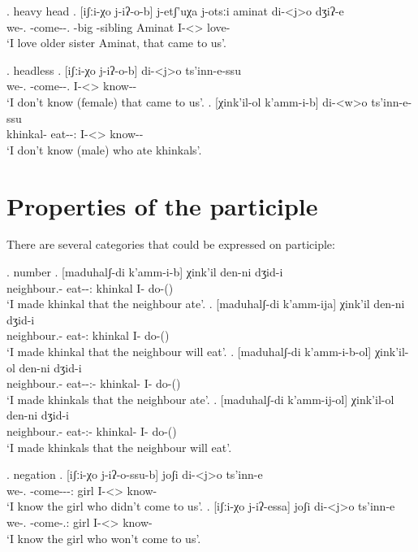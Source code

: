 \ex. heavy head
	\ag.  [iʃːi-χo j-iʔ-o-b] j-etʃ'uχa j-otsːi aminat di-<j>o dʒiʔ-e\\
			{we-\Add.\Lat} {\F-come-\Pst-\Ptcp.\Pst} {\F-big} {\F-sibling} Aminat {I-<\F>\Aff} {love-\Hab}\\
			\glt `I love older sister Aminat, that came to us'.

\ex. headless
	\ag.  [iʃːi-χo j-iʔ-o-b] di-<j>o ts'inn-e-ssu\\
			{we-\Add.\Lat} {\F-come-\Pst-\Ptcp.\Pst} {I-<\F>\Aff} {know-\Hab-\Neg}\\
			\glt `I don't know (female) that came to us'.
	\bg.  [χink'il-ol k'amm-i-b] di-<w>o ts'inn-e-ssu\\
			{khinkal-\Pl} {eat-\Pst-\Ptcp:\Pst} {I-<\M>\Aff} {know-\Hab-\Neg}\\
			\glt `I don't know (male) who ate khinkals'.

\section{Properties of the participle}
There are several categories that could be expressed on participle:

\ex. number
	\ag. [maduhalʃ-di k'amm-i-b] χink'il den-ni dʒid-i\\
			{neighbour.\Obl-\Erg} {eat-\Pst-\Ptcp:\Pst} {khinkal}  {I-\Erg} {do-\Pst(\Aor)}\\
		 \glt    `I made khinkal that the neighbour ate'.
	\bg. [maduhalʃ-di k'amm-ija] χink'il den-ni dʒid-i\\
			{neighbour.\Obl-\Erg} {eat-\Ptcp:\Prae} {khinkal}  {I-\Erg} {do-\Pst(\Aor)}\\
		 \glt    `I made khinkal that the neighbour will eat'.	
	\bg. [maduhalʃ-di k'amm-i-b-ol] χink'il-ol den-ni dʒid-i\\
			{neighbour.\Obl-\Erg} {eat-\Pst-\Ptcp:\Pst-\Pl} {khinkal-\Pl}  {I-\Erg} {do-\Pst(\Aor)}\\
		 \glt    `I made khinkals that the neighbour ate'.
	\bg. [maduhalʃ-di k'amm-ij-ol] χink'il-ol den-ni dʒid-i\\
			{neighbour.\Obl-\Erg} {eat-\Ptcp:\Prae-\Pl} {khinkal-\Pl}  {I-\Erg} {do-\Pst(\Aor)}\\
		 \glt    `I made khinkals that the neighbour will eat'.	

\ex. negation
	\ag. [iʃːi-χo j-iʔ-o-ssu-b] joʃi di-<j>o ts'inn-e \\
		  {we-\Add.\Lat} {\F-come-\Pst-\Neg-\Ptcp:\Pst} {girl} {I-<\F>\Aff} {know-\Hab}\\
		 \glt    `I know the girl who didn't come to us'.
	\bg. [iʃːi-χo j-iʔ-essa] joʃi di-<j>o ts'inn-e \\
		  {we-\Add.\Lat} {\F-come-\Neg.\Ptcp:\Prae} {girl} {I-<\F>\Aff} {know-\Hab}\\
		 \glt    `I know the girl who won't come to us'.
		 
